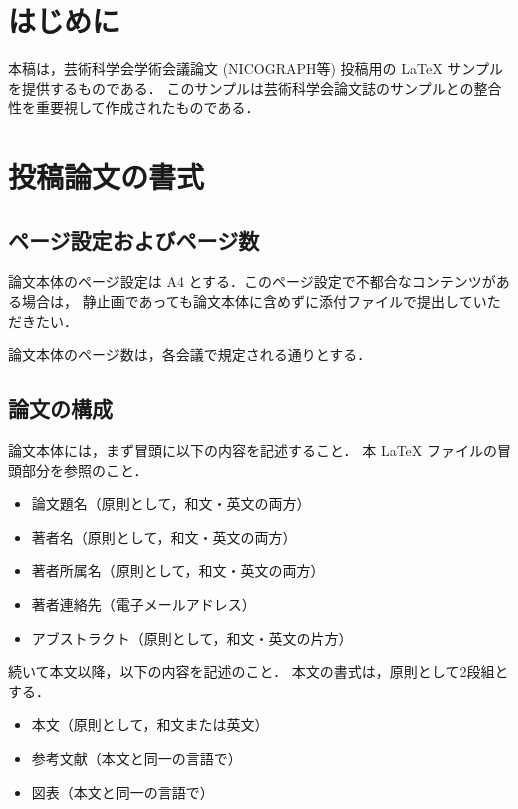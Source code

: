 \documentclass[a4paper,twocolumn,dvipdfmx]{jsarticle}
\begin{document}
\maketitle
\thispagestyle{aspagestyle}

\section{はじめに}

本稿は，芸術科学会学術会議論文 (NICOGRAPH等) 投稿用の LaTeX サンプルを提供するものである．
このサンプルは芸術科学会論文誌のサンプルとの整合性を重要視して作成されたものである．

\section{投稿論文の書式}

\subsection{ページ設定およびページ数}

論文本体のページ設定は A4 とする．このページ設定で不都合なコンテンツがある場合は，
静止画であっても論文本体に含めずに添付ファイルで提出していただきたい．

論文本体のページ数は，各会議で規定される通りとする．

\subsection{論文の構成}

論文本体には，まず冒頭に以下の内容を記述すること．
本 LaTeX ファイルの冒頭部分を参照のこと．

\begin{itemize}
\item 論文題名（原則として，和文・英文の両方）
\item 著者名（原則として，和文・英文の両方）
\item 著者所属名（原則として，和文・英文の両方）
\item 著者連絡先（電子メールアドレス）
\item アブストラクト（原則として，和文・英文の片方）
\end{itemize}
続いて本文以降，以下の内容を記述のこと．
本文の書式は，原則として2段組とする． 
\begin{itemize}
\item 本文（原則として，和文または英文）
\item 参考文献（本文と同一の言語で）
\item 図表（本文と同一の言語で）
\end{itemize}
\end{document}
